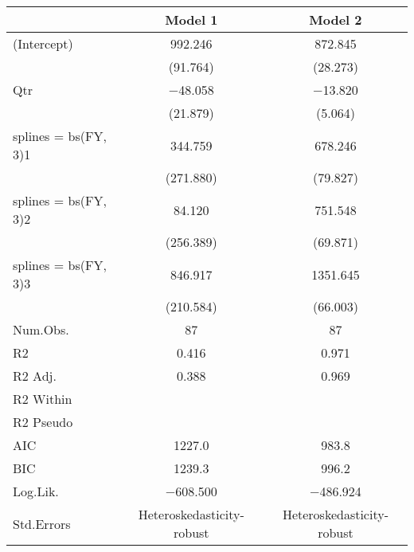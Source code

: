 \begin{table}
\centering
\begin{tabular}[t]{lcc}
\toprule
  & Model 1 & Model 2\\
\midrule
(Intercept) & \num{992.246} & \num{872.845}\\
 & (\num{91.764}) & (\num{28.273})\\
Qtr & \num{-48.058} & \num{-13.820}\\
 & (\num{21.879}) & (\num{5.064})\\
splines = bs(FY, 3)1 & \num{344.759} & \num{678.246}\\
 & (\num{271.880}) & (\num{79.827})\\
splines = bs(FY, 3)2 & \num{84.120} & \num{751.548}\\
 & (\num{256.389}) & (\num{69.871})\\
splines = bs(FY, 3)3 & \num{846.917} & \num{1351.645}\\
 & (\num{210.584}) & (\num{66.003})\\
\midrule
Num.Obs. & \num{87} & \num{87}\\
R2 & \num{0.416} & \num{0.971}\\
R2 Adj. & \num{0.388} & \num{0.969}\\
R2 Within &  & \\
R2 Pseudo &  & \\
AIC & \num{1227.0} & \num{983.8}\\
BIC & \num{1239.3} & \num{996.2}\\
Log.Lik. & \num{-608.500} & \num{-486.924}\\
Std.Errors & Heteroskedasticity-robust & Heteroskedasticity-robust\\
\bottomrule
\end{tabular}
\end{table}

